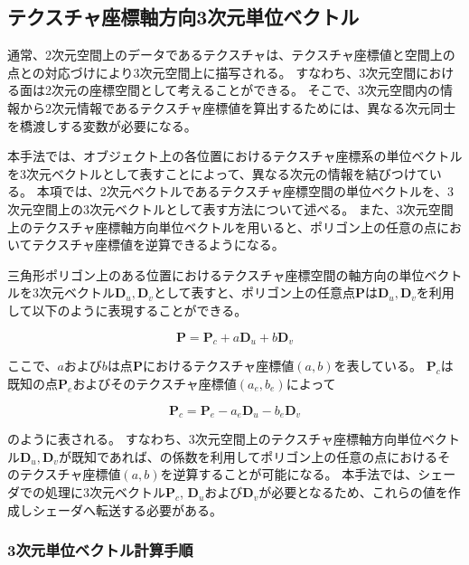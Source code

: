 \subsection{テクスチャ座標軸方向3次元単位ベクトル}
\label{SSUnitvec}

通常、2次元空間上のデータであるテクスチャは、テクスチャ座標値と空間上の点との対応づけにより3次元空間上に描写される。
すなわち、3次元空間における面は2次元の座標空間として考えることができる\figref{}。
そこで、3次元空間内の情報から2次元情報であるテクスチャ座標値を算出するためには、異なる次元同士を橋渡しする変数が必要になる。

本手法では、オブジェクト上の各位置におけるテクスチャ座標系の単位ベクトルを3次元ベクトルとして表すことによって、異なる次元の情報を結びつけている。
本項では、2次元ベクトルであるテクスチャ座標空間の単位ベクトルを、3次元空間上の3次元ベクトルとして表す方法について述べる。
また、3次元空間上のテクスチャ座標軸方向単位ベクトルを用いると、ポリゴン上の任意の点においてテクスチャ座標値を逆算できるようになる。

三角形ポリゴン上のある位置におけるテクスチャ座標空間の軸方向の単位ベクトルを3次元ベクトル$\bm{D}_u, \bm{D}_v$として表すと、ポリゴン上の任意点$\bm{P}$は$\bm{D}_u, \bm{D}_v$を利用して以下のように表現することができる。

\begin{equation}
\bm{P} = \bm{P}_c + a\bm{D}_u + b\bm{D}_v
\label{EPuv}
\end{equation}

\noindent
ここで、$a$および$b$は点$\bm{P}$におけるテクスチャ座標値$(a, b)$を表している。
$\bm{P}_c$は既知の点$\bm{P}_e$およびそのテクスチャ座標値$(a_e, b_e)$によって

\begin{equation}
\bm{P}_c = \bm{P}_e - a_e\bm{D}_u - b_e\bm{D}_v
\label{EPc}
\end{equation}

\noindent
{}のように表される。
すなわち、3次元空間上のテクスチャ座標軸方向単位ベクトル$\bm{D}_u, \bm{D}_v$が既知であれば、の係数を利用してポリゴン上の任意の点におけるそのテクスチャ座標値$(a, b)$を逆算することが可能になる。
本手法では、シェーダでの処理に3次元ベクトル$\bm{P}_c$, $\bm{D}_u$および$\bm{D}_v$が必要となるため、これらの値を作成しシェーダへ転送する必要がある。

\subsubsection*{3次元単位ベクトル計算手順}

